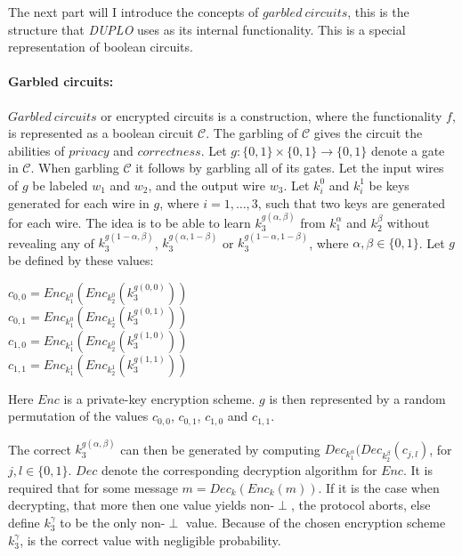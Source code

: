 \documentclass[twoside,11pt,openright]{report}
\newcommand{\DUPLO}{\textit{DUPLO} }
\begin{document}
The next part will I introduce the concepts of $garbled~circuits$, this is the structure that \DUPLO uses as its internal functionality. This is a special representation of boolean circuits.

\paragraph{Garbled circuits:} 
$Garbled~circuits$ or encrypted circuits is a construction, where the functionality $f$, is represented as a boolean circuit $\mathcal{C}$. The garbling of $\mathcal{C}$ gives the circuit the abilities of $privacy$ and $correctness$. Let $g:\{0,1\}\times \{0,1\} \to \{0,1\}$ denote a gate in $\mathcal{C}$. When garbling $\mathcal{C}$ it follows by garbling all of its gates. Let the input wires of $g$ be labeled $w_1$ and $w_2$, and the output wire $w_3$. Let $k^0_i$ and $k^1_i$ be keys generated for each wire in $g$, where $i=1,\dots,3$, such that two keys are generated for each wire. The idea is to be able to learn $k^{g(\alpha,\beta)}_3$ from $k^\alpha_1$ and $k^\beta_2$ without revealing any of $k^{g(1-\alpha,\beta)}_3$, $k^{g(\alpha,1-\beta)}_3$ or $k^{g(1-\alpha,1-\beta)}_3$, where $\alpha,\beta\in\{0,1\}$. Let $g$ be defined by these values:

\begin{center}
    $c_{0,0} = Enc_{k^0_1}(Enc_{k^0_2}(k^{g(0,0)}_3))$    \\
    $c_{0,1} = Enc_{k^0_1}(Enc_{k^1_2}(k^{g(0,1)}_3))$    \\
    $c_{1,0} = Enc_{k^1_1}(Enc_{k^0_2}(k^{g(1,0)}_3))$    \\
    $c_{1,1} = Enc_{k^1_1}(Enc_{k^1_2}(k^{g(1,1)}_3))$    \\
\end{center}

Here $Enc$ is a private-key encryption scheme. $g$ is then represented by a random permutation of the values $c_{0,0}$, $c_{0,1}$, $c_{1,0}$ and $c_{1,1}$.

The correct $k^{g(\alpha,\beta)}_3$ can then be generated by computing $Dec_{k^\alpha_1}(Dec_{k^\beta_2}(c_{j,l})$, for $j,l\in\{0,1\}$. $Dec$ denote the corresponding decryption algorithm for $Enc$. It is required that for some message $m=Dec_k(Enc_k(m))$. If it is the case when decrypting, that more then one value yields non-$\perp$, the protocol aborts, else define $k^\gamma_3$ to be the only non-$\perp$ value. Because of the chosen encryption scheme $k^\gamma_3$, is the correct value with negligible probability.
\end{document}
